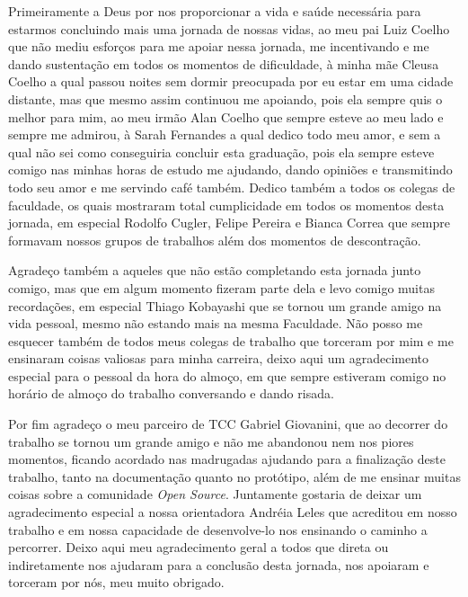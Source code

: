 \begin{agradecimentos}
Primeiramente a Deus por nos proporcionar a vida e saúde necessária para estarmos concluindo mais uma jornada de nossas vidas, ao meu pai Luiz Coelho que não mediu esforços para me apoiar nessa jornada, me incentivando e me dando sustentação em todos os momentos de dificuldade, à minha mãe Cleusa Coelho a qual passou noites sem dormir preocupada por eu estar em uma cidade distante, mas que mesmo assim continuou me apoiando, pois ela sempre quis o melhor para mim, ao meu irmão Alan Coelho que sempre esteve ao meu lado e sempre me admirou, à Sarah Fernandes a qual dedico todo meu amor, e sem a qual não sei como conseguiria concluir esta graduação, pois ela sempre esteve comigo nas minhas horas de estudo me ajudando, dando opiniões e transmitindo todo seu amor e me servindo café também. Dedico também a todos os colegas de faculdade, os quais mostraram total cumplicidade em todos os momentos desta jornada, em especial Rodolfo Cugler, Felipe Pereira e Bianca Correa que sempre formavam nossos grupos de trabalhos além dos momentos de descontração.

Agradeço também a aqueles que não estão completando esta jornada junto comigo, mas que em algum momento fizeram parte dela e levo comigo muitas recordações, em especial Thiago Kobayashi que se tornou um grande amigo na vida pessoal, mesmo não estando mais na mesma Faculdade. Não posso me esquecer também de todos meus colegas de trabalho que torceram por mim e me ensinaram coisas valiosas para minha carreira, deixo aqui um agradecimento especial para o pessoal da hora do almoço, em que sempre estiveram comigo no horário de almoço do trabalho conversando e dando risada.

Por fim agradeço o meu parceiro de TCC Gabriel Giovanini, que ao decorrer do trabalho se tornou um grande amigo e não me abandonou nem nos piores momentos, ficando acordado nas madrugadas ajudando para a finalização deste trabalho, tanto na documentação quanto no protótipo, além de me ensinar muitas coisas sobre a comunidade \textit{Open Source}. Juntamente gostaria de deixar um agradecimento especial a nossa orientadora Andréia Leles que acreditou em nosso trabalho e em nossa capacidade de desenvolve-lo nos ensinando o caminho a percorrer. Deixo aqui meu agradecimento geral a todos que direta ou indiretamente nos ajudaram para a conclusão desta jornada, nos apoiaram e torceram por nós, meu muito obrigado.
\end{agradecimentos}